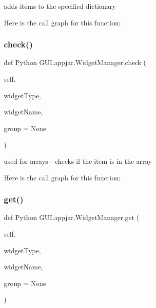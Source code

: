 \begin{DoxyVerb}adds items to the specified dictionary \end{DoxyVerb}
 Here is the call graph for this function\+:
\mbox{\label{class_python_01_g_u_i_1_1appjar_1_1_widget_manager_aaeef5f0473230a252d05fe78b7710991}} 
\subsubsection{\texorpdfstring{check()}{check()}}
{\footnotesize\ttfamily def Python G\+U\+I.\+appjar.\+Widget\+Manager.\+check (\begin{DoxyParamCaption}\item[{}]{self,  }\item[{}]{widget\+Type,  }\item[{}]{widget\+Name,  }\item[{}]{group = {\ttfamily None} }\end{DoxyParamCaption})}

\begin{DoxyVerb}used for arrays - checks if the item is in the array \end{DoxyVerb}
 Here is the call graph for this function\+:
\mbox{\label{class_python_01_g_u_i_1_1appjar_1_1_widget_manager_a19270fe453a4d39780d54d5a076180e8}} 
\subsubsection{\texorpdfstring{get()}{get()}}
{\footnotesize\ttfamily def Python G\+U\+I.\+appjar.\+Widget\+Manager.\+get (\begin{DoxyParamCaption}\item[{}]{self,  }\item[{}]{widget\+Type,  }\item[{}]{widget\+Name,  }\item[{}]{group = {\ttfamily None} }\end{DoxyParamCaption})}

